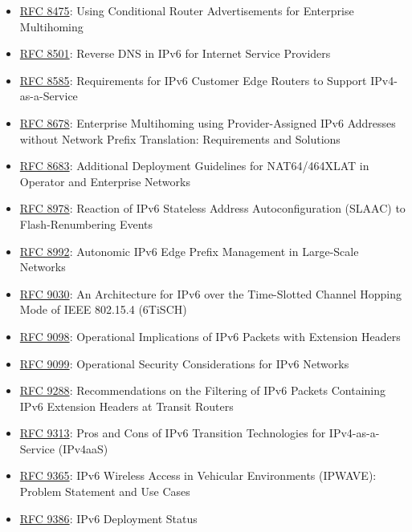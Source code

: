 \documentclass[
]{article}
\begin{document}
\begin{itemize}
  (IPPM) Framework
\item
  \href{https://www.rfc-editor.org/info/rfc8475}{RFC 8475}: Using
  Conditional Router Advertisements for Enterprise Multihoming
\item
  \href{https://www.rfc-editor.org/info/rfc8501}{RFC 8501}: Reverse DNS
  in IPv6 for Internet Service Providers
\item
  \href{https://www.rfc-editor.org/info/rfc8585}{RFC 8585}: Requirements
  for IPv6 Customer Edge Routers to Support IPv4-as-a-Service
\item
  \href{https://www.rfc-editor.org/info/rfc8678}{RFC 8678}: Enterprise
  Multihoming using Provider-Assigned IPv6 Addresses without Network
  Prefix Translation: Requirements and Solutions
\item
  \href{https://www.rfc-editor.org/info/rfc8683}{RFC 8683}: Additional
  Deployment Guidelines for NAT64/464XLAT in Operator and Enterprise
  Networks
\item
  \href{https://www.rfc-editor.org/info/rfc8978}{RFC 8978}: Reaction of
  IPv6 Stateless Address Autoconfiguration (SLAAC) to Flash-Renumbering
  Events
\item
  \href{https://www.rfc-editor.org/info/rfc8992}{RFC 8992}: Autonomic
  IPv6 Edge Prefix Management in Large-Scale Networks
\item
  \href{https://www.rfc-editor.org/info/rfc9030}{RFC 9030}: An
  Architecture for IPv6 over the Time-Slotted Channel Hopping Mode of
  IEEE 802.15.4 (6TiSCH)
\item
  \href{https://www.rfc-editor.org/info/rfc9098}{RFC 9098}: Operational
  Implications of IPv6 Packets with Extension Headers
\item
  \href{https://www.rfc-editor.org/info/rfc9099}{RFC 9099}: Operational
  Security Considerations for IPv6 Networks
\item
  \href{https://www.rfc-editor.org/info/rfc9288}{RFC 9288}:
  Recommendations on the Filtering of IPv6 Packets Containing IPv6
  Extension Headers at Transit Routers
\item
  \href{https://www.rfc-editor.org/info/rfc9313}{RFC 9313}: Pros and
  Cons of IPv6 Transition Technologies for IPv4-as-a-Service (IPv4aaS)
\item
  \href{https://www.rfc-editor.org/info/rfc9365}{RFC 9365}: IPv6
  Wireless Access in Vehicular Environments (IPWAVE): Problem Statement
  and Use Cases
\item
  \href{https://www.rfc-editor.org/info/rfc9386}{RFC 9386}: IPv6
  Deployment Status

\end{itemize}
\end{document}
